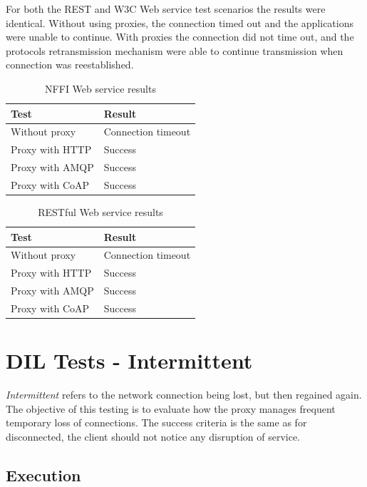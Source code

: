 For both the REST and W3C Web service test scenarios the results were identical.
Without using proxies, the connection timed out and the applications were unable
to continue. With proxies the connection did not time out, and the protocols
retransmission mechanism were able to continue transmission when connection was
reestablished.

\begin{table}[h!]
\begin{tabular}{| l | l |}
\hline
  \textbf{Test} & \textbf{Result} \\ \hline
  Without proxy & Connection timeout \\ \hline
  Proxy with HTTP & Success \\ \hline
  Proxy with AMQP & Success \\ \hline
  Proxy with CoAP & Success \\ \hline
\end{tabular}
\caption{NFFI Web service results}
\end{table}

\begin{table}[h!]
\begin{tabular}{| l | l |}
\hline
  \textbf{Test} & \textbf{Result} \\ \hline
  Without proxy & Connection timeout \\ \hline
  Proxy with HTTP & Success \\ \hline
  Proxy with AMQP & Success \\ \hline
  Proxy with CoAP & Success \\ \hline
\end{tabular}
\caption{RESTful Web service results}
\end{table}



\section{DIL Tests - Intermittent}

\textit{Intermittent} refers to the network connection being lost, but then
regained again. The objective of this testing is to evaluate how the proxy
manages frequent temporary loss of connections. The success criteria is the same
as for disconnected, the client should not notice any disruption of service.

\subsection{Execution}

